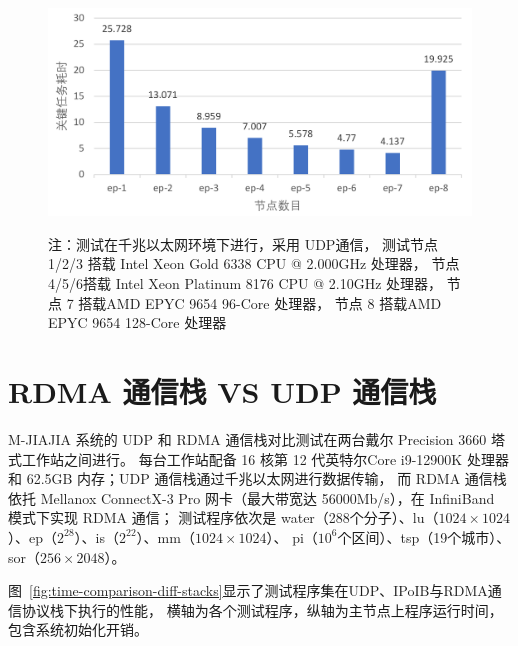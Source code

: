 {    \begin{figure}[!htbp]
        \centering
        \includegraphics[width=\linewidth]{Img/EP-performance.pdf}
        \label{fig:ep-performance}
        {\footnotesize \par 注：测试在千兆以太网环境下进行，采用 UDP通信，
            测试节点1/2/3 搭载 Intel Xeon Gold 6338 CPU @ 2.000GHz 处理器，
            节点4/5/6搭载 Intel Xeon Platinum 8176 CPU @ 2.10GHz 处理器，
            节点 7 搭载AMD EPYC 9654 96-Core 处理器，
            节点 8 搭载AMD EPYC 9654 128-Core 处理器}
    \end{figure}

    \section{RDMA 通信栈 VS UDP 通信栈}

    M-JIAJIA 系统的 UDP 和 RDMA 通信栈对比测试在两台戴尔 Precision 3660 塔式工作站之间进行。
    每台工作站配备 16 核第 12 代英特尔Core i9-12900K 处理器和 62.5GB 内存；UDP 通信栈通过千兆以太网进行数据传输，
    而 RDMA 通信栈依托 Mellanox ConnectX-3 Pro 网卡（最大带宽达 56000Mb/s），在 InfiniBand 模式下实现 RDMA 通信；
    测试程序依次是 water（288个分子）、lu（$1024\times1024$）、ep（$2^{28}$）、is（$2^{22}$）、mm（$1024\times1024$）、
    pi（$10^6$个区间）、tsp（19个城市）、sor（$256\times2048$）。

    图~\ref{fig:time-comparison-diff-stacks}显示了测试程序集在UDP、IPoIB与RDMA通信协议栈下执行的性能，
    横轴为各个测试程序，纵轴为主节点上程序运行时间，包含系统初始化开销。

}
